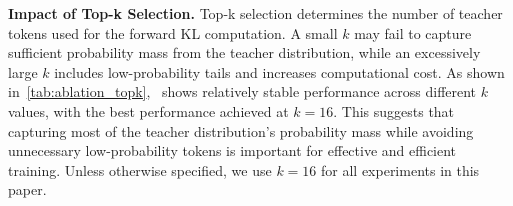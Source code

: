 \newpage
\textbf{Impact of Top-k Selection.}
Top-k selection determines the number of teacher tokens used for the forward KL computation. A small $k$ may fail to capture sufficient probability mass from the teacher distribution, while an excessively large $k$ includes low-probability tails and increases computational cost.
As shown in~\autoref{tab:ablation_topk}, \method~shows relatively stable performance across different $k$ values, with the best performance achieved at $k = 16$. This suggests that capturing most of the teacher distribution’s probability mass while avoiding unnecessary low-probability tokens is important for effective and efficient training. Unless otherwise specified, we use $k = 16$ for all experiments in this paper.

\begin{table}[ht]
\centering
\caption{
Impact of top-k selection for the Qwen3-1.7B-Base student. \textbf{Bold} indicates the best performance and \underline{underline} indicates second-best.
}
\label{tab:ablation_topk}
\end{table}